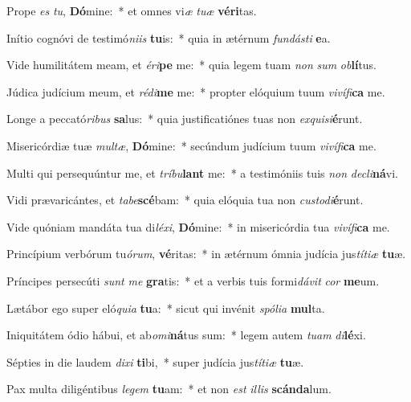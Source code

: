 \item Prope \textit{es} \textit{tu}, \textbf{Dó}mine:~* et omnes vi\textit{æ} \textit{tu}\textit{æ} \textbf{vé}\textbf{ri}tas.
\item Inítio cognóvi de testimó\textit{ni}\textit{is} \textbf{tu}is:~* quia in ætérnum \textit{fun}\textit{dás}\textit{ti} \textbf{e}a.
\item Vide humilitátem meam, et \textit{é}\textit{ri}\textbf{pe} me:~* quia legem tuam \textit{non} \textit{sum} \textit{ob}\textbf{lí}tus.
\item Júdica judícium meum, et \textit{réd}\textit{i}\textbf{me} me:~* propter elóquium tuum \textit{vi}\textit{ví}\textit{fi}\textbf{ca} me.
\item Longe a peccató\textit{ri}\textit{bus} \textbf{sa}lus:~* quia justificatiónes tuas non \textit{ex}\textit{qui}\textit{si}\textbf{é}runt.
\item Misericórdiæ tuæ \textit{mul}\textit{tæ}, \textbf{Dó}mine:~* secúndum judícium tuum \textit{vi}\textit{ví}\textit{fi}\textbf{ca} me.
\item Multi qui persequúntur me, et \textit{trí}\textit{bu}\textbf{lant} me:~* a testimóniis tuis \textit{non} \textit{de}\textit{cli}\textbf{ná}vi.
\item Vidi prævaricántes, et \textit{ta}\textit{be}\textbf{scé}bam:~* quia elóquia tua non \textit{cus}\textit{to}\textit{di}\textbf{é}runt.
\item Vide quóniam mandáta tua di\textit{lé}\textit{xi}, \textbf{Dó}mine:~* in misericórdia tua \textit{vi}\textit{ví}\textit{fi}\textbf{ca} me.
\item Princípium verbórum tu\textit{ó}\textit{rum}, \textbf{vé}ritas:~* in ætérnum ómnia judícia jus\textit{tí}\textit{ti}\textit{æ} \textbf{tu}æ.
\item Príncipes persecúti \textit{sunt} \textit{me} \textbf{gra}tis:~* et a verbis tuis formi\textit{dá}\textit{vit} \textit{cor} \textbf{me}um.
\item Lætábor ego super eló\textit{qui}\textit{a} \textbf{tu}a:~* sicut qui invénit \textit{spó}\textit{li}\textit{a} \textbf{mul}ta.
\item Iniquitátem ódio hábui, et ab\textit{o}\textit{mi}\textbf{ná}tus sum:~* legem autem \textit{tu}\textit{am} \textit{di}\textbf{lé}xi.
\item Sépties in die laudem \textit{di}\textit{xi} \textbf{ti}bi,~* super judícia jus\textit{tí}\textit{ti}\textit{æ} \textbf{tu}æ.
\item Pax multa diligéntibus \textit{le}\textit{gem} \textbf{tu}am:~* et non \textit{est} \textit{il}\textit{lis} \textbf{scán}\textbf{da}lum.

